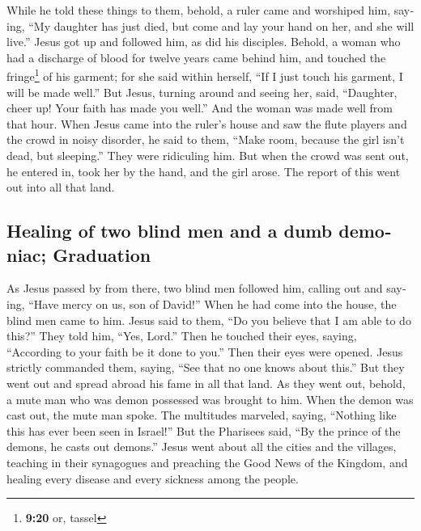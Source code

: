 \begin{paracol}{2}
\begin{otherlanguage}{english}
 While he told these things to them, behold, a ruler came
and worshiped him, saying, ``My daughter has just died, but come and lay
your hand on her, and she will live.''  Jesus got up and
followed him, as did his disciples.  Behold, a woman who
had a discharge of blood for twelve years came behind him, and touched
the fringe\footnote{\textbf{9:20} or, tassel} of his garment;
 for she said within herself, ``If I just touch his
garment, I will be made well.''  But Jesus, turning
around and seeing her, said, ``Daughter, cheer up! Your faith has made
you well.'' And the woman was made well from that hour. 
When Jesus came into the ruler's house and saw the flute players and the
crowd in noisy disorder,  he said to them, ``Make room,
because the girl isn't dead, but sleeping.'' They were ridiculing him.
 But when the crowd was sent out, he entered in, took her
by the hand, and the girl arose.  The report of this went
out into all that land.

\hypertarget{healing-of-two-blind-men-and-a-dumb-demoniac-graduation}{%
\subsection{Healing of two blind men and a dumb demoniac;
Graduation}\label{healing-of-two-blind-men-and-a-dumb-demoniac-graduation}}

 As Jesus passed by from there, two blind men followed
him, calling out and saying, ``Have mercy on us, son of David!''
 When he had come into the house, the blind men came to
him. Jesus said to them, ``Do you believe that I am able to do this?''
They told him, ``Yes, Lord.''  Then he touched their
eyes, saying, ``According to your faith be it done to you.''
 Then their eyes were opened. Jesus strictly commanded
them, saying, ``See that no one knows about this.''  But
they went out and spread abroad his fame in all that land.
 As they went out, behold, a mute man who was demon
possessed was brought to him.  When the demon was cast
out, the mute man spoke. The multitudes marveled, saying, ``Nothing like
this has ever been seen in Israel!''  But the Pharisees
said, ``By the prince of the demons, he casts out demons.''
 Jesus went about all the cities and the villages,
teaching in their synagogues and preaching the Good News of the Kingdom,
and healing every disease and every sickness among the people.


\end{otherlanguage}
\end{paracol}
